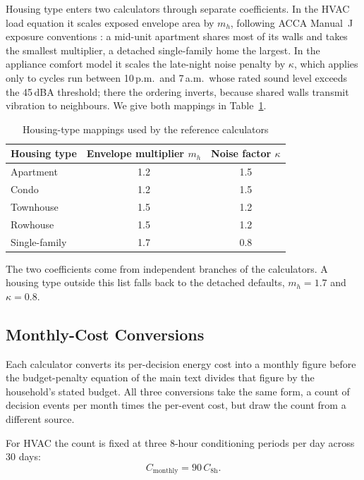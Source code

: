 \documentclass[11pt]{article}
\begin{document}
Housing type enters two calculators through separate coefficients. In the HVAC load equation it scales exposed envelope area by $m_h$, following ACCA Manual~J exposure conventions \citep{accamanualj}: a mid-unit apartment shares most of its walls and takes the smallest multiplier, a detached single-family home the largest. In the appliance comfort model it scales the late-night noise penalty by $\kappa$, which applies only to cycles run between 10\,p.m.\ and 7\,a.m.\ whose rated sound level exceeds the 45\,dBA threshold; there the ordering inverts, because shared walls transmit vibration to neighbours. We give both mappings in Table~\ref{tab:housing_mappings}.

\begin{table}[htbp]
\centering
\caption{Housing-type mappings used by the reference calculators}
\label{tab:housing_mappings}
\begin{tabular}{@{}lcc@{}}
\toprule
Housing type & Envelope multiplier $m_h$ & Noise factor $\kappa$ \\
\midrule
Apartment     & 1.2 & 1.5 \\
Condo         & 1.2 & 1.5 \\
Townhouse     & 1.5 & 1.2 \\
Rowhouse      & 1.5 & 1.2 \\
Single-family & 1.7 & 0.8 \\
\bottomrule
\end{tabular}
\end{table}

The two coefficients come from independent branches of the calculators. A housing type outside this list falls back to the detached defaults, $m_h = 1.7$ and $\kappa = 0.8$.

\subsection{Monthly-Cost Conversions}
\label{app:monthly_cost}

Each calculator converts its per-decision energy cost into a monthly figure before the budget-penalty equation of the main text divides that figure by the household's stated budget. All three conversions take the same form, a count of decision events per month times the per-event cost, but draw the count from a different source.

For HVAC the count is fixed at three 8-hour conditioning periods per day across 30 days:
\begin{equation}
C_{\mathrm{monthly}} = 90\,C_{\mathrm{8h}}.
\end{equation}
\end{document}
